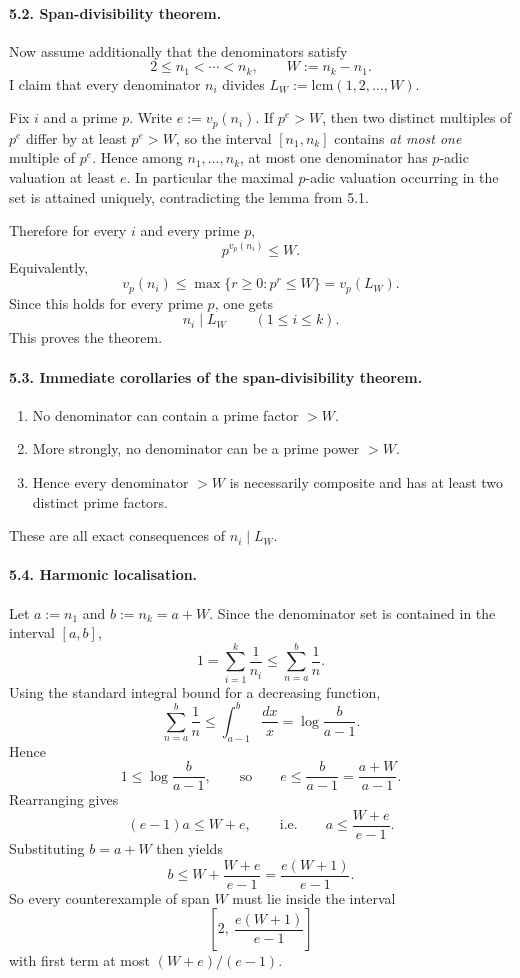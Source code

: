 \paragraph{5.2. Span-divisibility theorem.}
Now assume additionally that the denominators satisfy
\[
2\le n_1<\cdots<n_k,
\qquad
W:=n_k-n_1.
\]
I claim that every denominator $n_i$ divides $L_W:=\mathrm{lcm}(1,2,\dots,W)$.

Fix $i$ and a prime $p$. Write $e:=v_p(n_i)$. If $p^e>W$, then two distinct multiples of $p^e$ differ by at least $p^e>W$, so the interval $[n_1,n_k]$ contains \emph{at most one} multiple of $p^e$. Hence among $n_1,\dots,n_k$, at most one denominator has $p$-adic valuation at least $e$. In particular the maximal $p$-adic valuation occurring in the set is attained uniquely, contradicting the lemma from 5.1.

Therefore for every $i$ and every prime $p$,
\[
 p^{v_p(n_i)}\le W.
\]
Equivalently,
\[
 v_p(n_i)\le \max\{r\ge 0: p^r\le W\}=v_p(L_W).
\]
Since this holds for every prime $p$, one gets
\[
 n_i\mid L_W
\qquad (1\le i\le k).
\]
This proves the theorem.

\paragraph{5.3. Immediate corollaries of the span-divisibility theorem.}
\begin{enumerate}
\item No denominator can contain a prime factor $>W$.
\item More strongly, no denominator can be a prime power $>W$.
\item Hence every denominator $>W$ is necessarily composite and has at least two distinct prime factors.
\end{enumerate}
These are all exact consequences of $n_i\mid L_W$.

\paragraph{5.4. Harmonic localisation.}
Let $a:=n_1$ and $b:=n_k=a+W$. Since the denominator set is contained in the interval $[a,b]$,
\[
1=\sum_{i=1}^k \frac1{n_i}\le \sum_{n=a}^{b}\frac1n.
\]
Using the standard integral bound for a decreasing function,
\[
\sum_{n=a}^{b}\frac1n\le \int_{a-1}^{b}\frac{dx}{x}=\log\frac{b}{a-1}.
\]
Hence
\[
1\le \log\frac{b}{a-1},
\qquad\text{so}\qquad
 e\le \frac{b}{a-1}=\frac{a+W}{a-1}.
\]
Rearranging gives
\[
 (e-1)a\le W+e,
 \qquad\text{i.e.}\qquad
 a\le \frac{W+e}{e-1}.
\]
Substituting $b=a+W$ then yields
\[
 b\le W+\frac{W+e}{e-1}=\frac{e(W+1)}{e-1}.
\]
So every counterexample of span $W$ must lie inside the interval
\[
\left[2,\ \frac{e(W+1)}{e-1}\right]
\]
with first term at most $(W+e)/(e-1)$.

